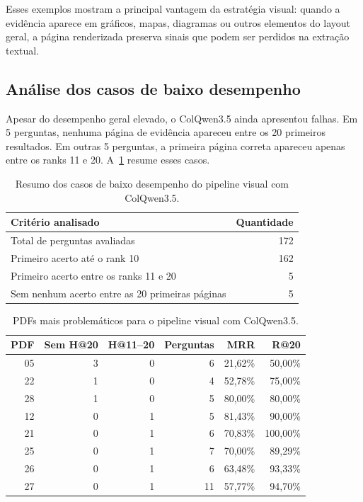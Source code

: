Esses exemplos mostram a principal vantagem da estratégia visual: quando a evidência aparece em gráficos, mapas, diagramas ou outros elementos do layout geral, a página renderizada preserva sinais que podem ser perdidos na extração textual.

\subsection{Análise dos casos de baixo desempenho}
\label{subsec:colvision-baixo-desempenho}

Apesar do desempenho geral elevado, o ColQwen3.5 ainda apresentou falhas. Em 5 perguntas, nenhuma página de evidência apareceu entre os 20 primeiros resultados. Em outras 5 perguntas, a primeira página correta apareceu apenas entre os ranks 11 e 20. A~\ref{tab:baixo-desempenho-colvision} resume esses casos.

\begin{table}[htbp]
\centering
\caption{Resumo dos casos de baixo desempenho do pipeline visual com ColQwen3.5.}
\label{tab:baixo-desempenho-colvision}
\small
\begin{tabular}{p{9.0cm}r}
\toprule
\textbf{Critério analisado} & \textbf{Quantidade} \\
\midrule
Total de perguntas avaliadas & 172 \\
Primeiro acerto até o rank 10 & 162 \\
Primeiro acerto entre os ranks 11 e 20 & 5 \\
Sem nenhum acerto entre as 20 primeiras páginas & 5 \\
\bottomrule
\end{tabular}
\end{table}

\begin{table}[htbp]
\centering
\caption{PDFs mais problemáticos para o pipeline visual com ColQwen3.5.}
\label{tab:pdfs-problematicos-colvision}
\small
\begin{tabular}{r r r r r r}
\toprule
\textbf{PDF} & \textbf{Sem H@20} & \textbf{H@11--20} & \textbf{Perguntas} & \textbf{MRR} & \textbf{R@20} \\
\midrule
05 & 3 & 0 & 6 & 21,62\% & 50,00\% \\
22 & 1 & 0 & 4 & 52,78\% & 75,00\% \\
28 & 1 & 0 & 5 & 80,00\% & 80,00\% \\
12 & 0 & 1 & 5 & 81,43\% & 90,00\% \\
21 & 0 & 1 & 6 & 70,83\% & 100,00\% \\
25 & 0 & 1 & 7 & 70,00\% & 89,29\% \\
26 & 0 & 1 & 6 & 63,48\% & 93,33\% \\
27 & 0 & 1 & 11 & 57,77\% & 94,70\% \\
\bottomrule
\end{tabular}
\end{table}


